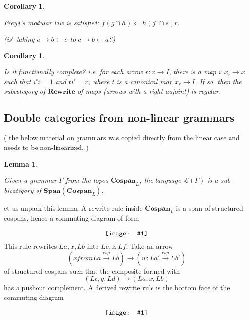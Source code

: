 \documentclass{amsart}
\newcommand{\from}{\colon}
\newcommand{\tocospan}{\xrightarrow{\mathit{csp}}}
\newcommand{\diagram}[1]{\raisebox{-0.5\height}{\texttt{[image: \#1]}}}
\newcommand{\Span}{\mathbf{Span}}
\newcommand{\Cospan}{\mathbf{Cospan}}
\newcommand{\Rewrite}{\mathbf{Rewrite} }
\newcommand{\edit}[1]{\textcolor{editcolour}{(#1)}}
\newenvironment{exposition}[1]{}{}
\newtheorem{lemma}[theorem]{Lemma}
\newtheorem{corollary}[theorem]{Corollary}
\theoremstyle{remark}
\theoremstyle{definition}
\begin{document}
\begin{corollary} \label{thm:bicat-rewr-freyds-modular}

  Freyd's modular law is satisfied:
  $ f (g \cap h) \Leftarrow h ( g^\circ \cap s ) r $.

  \edit{is$ ^\circ $ taking $ a \to b \gets c $ to
    $ c \to b\gets a $?}
  
\end{corollary} 

\begin{corollary}
  \label{thm:bicat-rewr-function-compl}

  Is it functionally complete? i.e. for each arrow
  $ r \from x \to I $, there is a map $ i \from x_r \to x $ such that
  $ i^\circ i = 1 $ and $ t i^\circ = r $, where $ t $ is a canonical
  map $ x_r \to I $. If so, then the subcategory of $ \Rewrite $ of
  maps (arrows with a right adjoint) is regular.
  
\end{corollary}


\subsection{Double categories from non-linear grammars}
\label{sec:dblcats-nonlinr-gramrs}



\edit{ the below material on grammars was copied directly from the
  linear case and needs to be non-linearized. }

\begin{lemma}
  \label{thm:nlr_open-objects-language}

  Given a grammar $ \Gamma $ from the topos $ \Cospan_L $, the
  language $ \mathcal{L}(\Gamma) $ is a sub-bicategory of
  $ \Span ( \Cospan_{L} ) $.
  
\end{lemma}

\begin{exposition}
  
  Let us unpack this lemma.  A rewrite rule inside \( \Cospan_L \) is
  a span of structured cospans, hence a commuting diagram of form
  \[
    \diagram{diag_lr_rewr-struct-cospans}
  \]
  This rule rewrites \( La , x , Lb \)
  into \( Le , z , Lf \).  Take an arrow
  \[
    ( x from La \tocospan Lb ) \to (w \from La' \tocospan Lb')
  \]
  of structured cospans such that the composite formed with
  \[
    ( Lc , y , Ld ) \to ( La , x , Lb )
  \]
  has a pushout complement. A derived rewrite rule is the bottom
  face of the commuting diagram
  \[
    \diagram{diag_lr_-derived-rewrite-rule}
  \]
  
\end{exposition}
\end{document}
